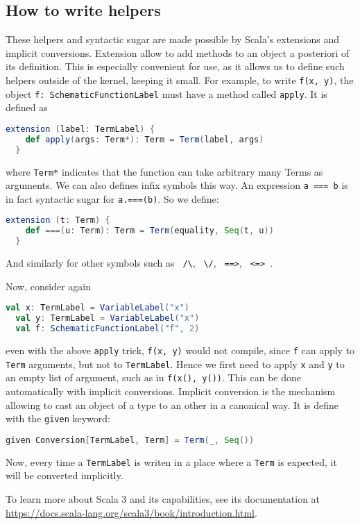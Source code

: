 \subsection{How to write helpers}
These helpers and syntactic sugar are made possible by Scala's extensions and implicit conversions. Extension allow to add methods to an object a posteriori of its definition. This is especially convenient for use, as it allows us to define such helpers outside of the kernel, keeping it small. 
For example, to write \lstinline|f(x, y)|, the object \lstinline|f: SchematicFunctionLabel| must have a method called \lstinline|apply|. It is defined as
\begin{lstlisting}[language=Scala]
  extension (label: TermLabel) {
    def apply(args: Term*): Term = Term(label, args)
  }
\end{lstlisting}
where \lstinline|Term*| indicates that the function can take arbitrary many Terms as arguments.
We can also defines infix symbols this way. An expression \lstinline|a === b| is in fact syntactic sugar for \lstinline|a.===(b)|. So we define:
\begin{lstlisting}[language=Scala]
  extension (t: Term) {
    def ===(u: Term): Term = Term(equality, Seq(t, u))
  }
\end{lstlisting}
And similarly for other symbols such as \lstinline| /\|, \lstinline| \/|, \lstinline| ==>|, \lstinline| <=> |.

Now, consider again
\begin{lstlisting}[language=Scala]
  val x: TermLabel = VariableLabel("x")
  val y: TermLabel = VariableLabel("x")
  val f: SchematicFunctionLabel("f", 2)
\end{lstlisting}
even with the above \lstinline|apply| trick, \lstinline|f(x, y)| would not compile, since \lstinline|f| can apply to \lstinline|Term| arguments, but not to \lstinline|TermLabel|. Hence we first need to apply \lstinline|x| and \lstinline|y| to an empty list of argument, such as in \lstinline|f(x(), y())|.
This can be done automatically with implicit conversions. Implicit conversion is the mechanism allowing to cast an object of a type to an other in a canonical way. It is define with the \lstinline|given| keyword:
\begin{lstlisting}[language=Scala]
  given Conversion[TermLabel, Term] = Term(_, Seq())
\end{lstlisting}
Now, every time a \lstinline|TermLabel| is writen in a place where a \lstinline|Term| is expected, it will be converted implicitly.

To learn more about Scala 3 and its capabilities, see its documentation at \url{https://docs.scala-lang.org/scala3/book/introduction.html}.


